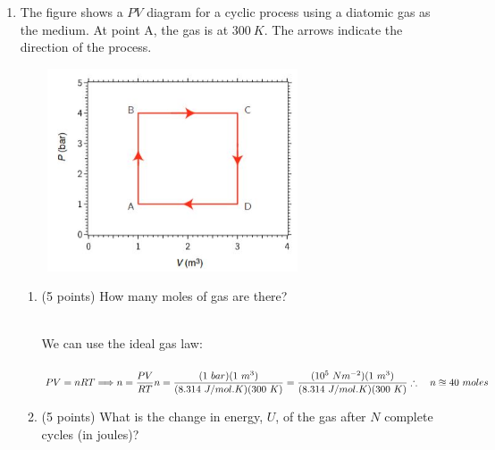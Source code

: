 \documentclass[fleqn]{article}
\begin{document}
\begin{enumerate}
    \item The figure shows a $PV$ diagram for a cyclic process using a diatomic gas as the medium. At
    point A, the gas is at $300 ~ K$. The arrows indicate the direction of the process.
    \begin{center}
      \includegraphics[height=6cm, width=9cm]{question6.JPG}
    \end{center}
    \begin{enumerate}
      \item (5 points) How many moles of gas are there?

        \textcolor{hwColor}{
          \\
          We can use the ideal gas law:
          \\
          \\
          $
            PV=nRT \Longrightarrow n=\dfrac{PV}{RT}
            \\
            \\
            \\
            n=\dfrac{(1 ~ bar) (1 ~ m^3)}{(8.314 ~ J/mol.K)(300 ~ K)}
            =\dfrac{(10^5 ~ Nm^{-2}) (1 ~ m^3)}{(8.314 ~ J/mol.K)(300 ~ K)}
            \\
            \\
            \\
            \therefore ~~~ n \approxeq 40 ~ moles
          $
          \\
        }

      \item (5 points) What is the change in energy, $U$, of the gas after $N$ complete cycles (in joules)?
  

\end{enumerate}
\end{enumerate}
\end{document}
